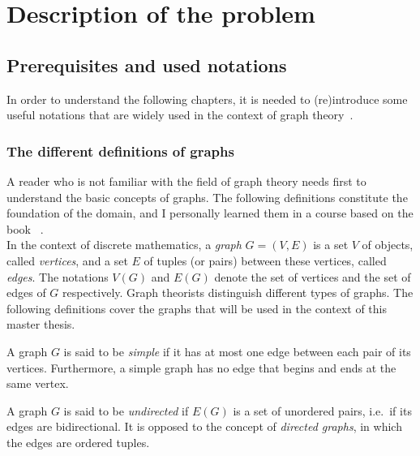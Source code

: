\setcounter{secnumdepth}{2}

\chapter{Description of the problem}
\label{ch:description-of-the-problem}


\section{Prerequisites and used notations}
\label{sec:prerequisites-and-used-notations}

In order to understand the following chapters, it is needed to (re)introduce some useful notations that are widely used in the context of graph theory~\cite{graphtheory}.


\subsection{The different definitions of graphs}
\label{subsec:the-different-definitions-of-graphs}

A reader who is not familiar with the field of graph theory needs first to understand the basic concepts of graphs.
The following definitions constitute the foundation of the domain, and I personally learned them in a course based on the book ~\cite{graphtheory}.\\

In the context of discrete mathematics, a \textit{graph} $G = (V, E)$ is a set $V$ of objects, called \textit{vertices}, and a set $E$ of tuples (or pairs) between these vertices, called \textit{edges}.
The notations $V(G)$ and $E(G)$ denote the set of vertices and the set of edges of $G$ respectively.
Graph theorists distinguish different types of graphs.
The following definitions cover the graphs that will be used in the context of this master thesis.

\begin{definition}
    \label{def:simple_graph}
    A graph $G$ is said to be \textit{simple} if it has at most one edge between each pair of its vertices.
    Furthermore, a simple graph has no edge that begins and ends at the same vertex.
\end{definition}

\begin{definition}
    \label{def:undirected_graph}
    A graph $G$ is said to be \textit{undirected} if $E(G)$ is a set of unordered pairs, i.e.\ if its edges are bidirectional.
    It is opposed to the concept of \textit{directed graphs}, in which the edges are ordered tuples.
\end{definition}

